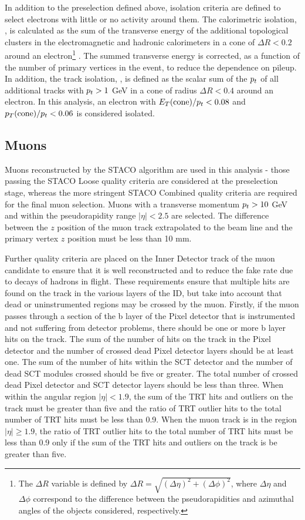 In addition to the preselection defined above, isolation criteria are
defined to select electrons with little or no activity around
them. The calorimetric isolation, \etcone, is calculated as the sum of
the transverse energy of the additional topological clusters in the
electromagnetic and hadronic calorimeters in a cone of $\Delta R <
0.2$ around an electron\footnote{The $\Delta R$ variable is defined by
$\Delta R=\sqrt{(\Delta\eta)^2+(\Delta\phi)^2}$, where $\Delta \eta$
and $\Delta \phi$ correspond to the difference between
the pseudorapidities and azimuthal angles of the objects considered, respectively.}
. The summed transverse energy is corrected, as a function of the
number of primary vertices in the event, to reduce the dependence on
pileup. In addition, the track isolation, \ptcone, is defined as the
scalar sum of the $p_{t}$ of all additional tracks with $p_{t}>1$ GeV in a
cone of radius $\Delta R<0.4$ around an electron. In this analysis, an
electron with $E_{T}(\mathrm{cone})/p_{t}<0.08$ and $p_{T}(\mathrm{cone})/p_{t}<0.06$ is considered isolated.


\subsection{Muons}
\label{sec:presel:muon}

Muons reconstructed by the STACO algorithm \cite{AtlasCSCBook} are
used in this analysis - those passing the STACO Loose quality criteria
are considered at the preselection stage, whereas the more stringent
STACO Combined quality criteria are required for the final muon
selection. Muons with a transverse momentum $p_{t} > 10$ GeV and
within the pseudorapidity range $|\eta| < 2.5$ are selected. The
difference between the $z$ position of the muon track extrapolated to
the beam line and the primary vertex $z$ position must be less than 10
mm. 

Further quality criteria are placed on the Inner Detector track of
the muon candidate to ensure that it is well reconstructed and to
reduce the fake rate due to decays of hadrons in flight. These
requirements ensure that multiple hits are found on the track in the
various layers of the ID, but take into account that dead or
uninstrumented regions may be crossed by the muon. Firstly, if the
muon passes through a section of the b layer of the Pixel detector
that is instrumented and not suffering from detector problems, there
should be one or more b layer hits on the track. The sum of the number
of hits on the track in the Pixel detector and the number of crossed
dead Pixel detector layers should be at least one. The sum of the
number of hits within the SCT detector and the number of dead SCT
modules crossed should be five or greater. The total number of crossed
dead Pixel detector and SCT detector layers should be less than three.
When within the angular region $|\eta|<1.9$, the sum of the TRT hits
and outliers on the track must be greater than five and the ratio of
TRT outlier hits to the total number of TRT hits must be less than
0.9. When the muon track is in the region $|\eta|\ge1.9$, the ratio of
TRT outlier hits to the total number of TRT hits must be less than 0.9
only if the sum of the TRT hits and outliers on the track is be
greater than five.

